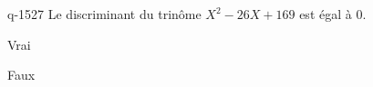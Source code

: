 \begin{truefalse}{q-1527}
Le discriminant du trinôme $X^2-26X+169$ est égal à $0$.
\item* Vrai
\item Faux
\end{truefalse}

